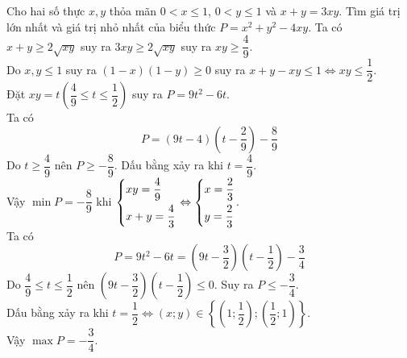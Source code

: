 \begin{ex}%
Cho hai số thực $x, y$ thỏa mãn $0<x \le 1$, $0<y \le 1$ và $x+y=3xy$. Tìm giá trị lớn nhất và giá trị nhỏ nhất của biểu thức $P=x^2+y^2-4xy$.
\loigiai
{
Ta có $x+y \ge 2\sqrt{xy}$ suy ra $3xy \ge 2 \sqrt{xy}$ suy ra $xy \ge \dfrac{4}{9}$.\\
Do $x, y \le 1$ suy ra $(1-x)(1-y) \ge 0$ suy ra $x+y-xy \le 1 \Leftrightarrow xy \le \dfrac{1}{2}$.\\
Đặt $xy=t \left( \dfrac{4}{9} \le t \le \dfrac{1}{2}\right)$ suy ra $P=9t^2-6t$.\\
Ta có $$P=(9t-4)\left(t-\dfrac{2}{9}\right)-\dfrac{8}{9}$$
Do $t \ge \dfrac{4}{9}$ nên $P \ge -\dfrac{8}{9}$. 
Dấu bằng xảy ra khi $t=\dfrac{4}{9}$.\\
Vậy $\min{P}=-\dfrac{8}{9}$ khi $\left\{\begin{aligned}&xy=\dfrac{4}{9} \\&x+y=\dfrac{4}{3}\end{aligned}\right. \Leftrightarrow \left\{\begin{aligned}&x=\dfrac{2}{3} \\ &y=\dfrac{2}{3}\end{aligned}\right.$.\\
Ta có 
\[P=9t^2-6t=\left(9t- \dfrac{3}{2}\right) \left( t-\dfrac{1}{2}\right)-\dfrac{3}{4} \]
Do $\dfrac{4}{9} \le t \le \dfrac{1}{2}$ nên $\left(9t- \dfrac{3}{2}\right) \left( t-\dfrac{1}{2}\right) \le 0$. Suy ra $P \le -\dfrac{3}{4}$.\\
Dấu bằng xảy ra khi $t=\dfrac{1}{2} \Leftrightarrow (x;y) \in \left\{ \left( 1; \dfrac{1}{2}\right); \left( \dfrac{1}{2}; 1 \right)\right\}$.\\
Vậy $\max{P}=-\dfrac{3}{4}$.
}
\end{ex}
